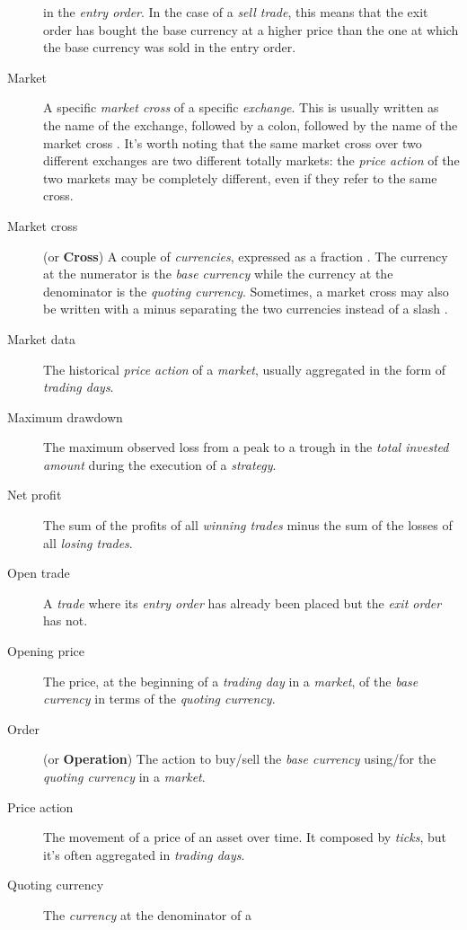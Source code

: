\begin{description}
		in the \textit{entry order}. In the case of a \textit{sell
		trade}, this means that the exit order has bought the base
		currency at a higher price than the one at which the base
		currency was sold in the entry order.
	\item[Market] A specific \textit{market cross} of a specific
		\textit{exchange}. This is usually written as the name of the
		exchange, followed by a colon, followed by the name of the
		market cross . It's worth
		noting that the same market cross over two different exchanges
		are two different totally markets: the \textit{price action} of
		the two markets may be completely different, even if they refer
		to the same cross.
	\item[Market cross] (or \textbf{Cross}) A couple of \textit{currencies},
		expressed as a fraction . The currency at the numerator is the
		\textit{base currency} while the currency at the denominator is
		the \textit{quoting currency}. Sometimes, a market cross may
		also be written with a minus separating the two currencies
		instead of a slash .
	\item[Market data] The historical \textit{price action} of a
		\textit{market}, usually aggregated in the form of
		\textit{trading days}.
	\item[Maximum drawdown] The maximum observed loss from a peak to a
		trough in the \textit{total invested amount} during the
		execution of a \textit{strategy}.
	\item[Net profit] The sum of the profits of all \textit{winning trades}
		minus the sum of the losses of all \textit{losing trades}.
	\item[Open trade] A \textit{trade} where its \textit{entry order} has
		already been placed but the \textit{exit order} has not.
	\item[Opening price] The price, at the beginning of a \textit{trading
		day} in a \textit{market}, of the \textit{base currency} in
		terms of the \textit{quoting currency}.
	\item[Order] (or \textbf{Operation}) The action to buy/sell the
		\textit{base currency} using/for the \textit{quoting currency}
		in a \textit{market}.
	\item[Price action] The movement of a price of an asset over time. It
		composed by \textit{ticks}, but it's often aggregated in
		\textit{trading days}.
	\item[Quoting currency] The \textit{currency} at the denominator of a

\end{description}
